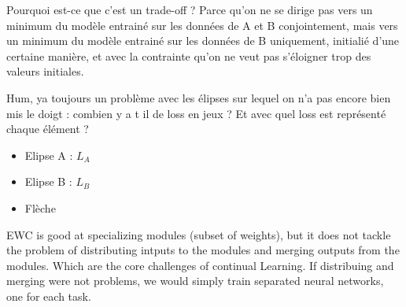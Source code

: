 \documentclass[twocolumn]{article}
\begin{document}
\vspace{1mm}
\noindent
Pourquoi est-ce que c'est un trade-off ? Parce qu'on ne se dirige pas vers un minimum du modèle entrainé sur les données de A et B conjointement, mais vers un minimum du modèle entrainé sur les données de B uniquement, initialié d'une certaine manière, et avec la contrainte qu'on ne veut pas s'éloigner trop des valeurs initiales.

\vspace{1mm}
\noindent
Hum, ya toujours un problème avec les élipses sur lequel on n'a pas encore bien mis le doigt : combien y a t il de loss en jeux ? Et avec quel loss est représenté chaque élément ?
\begin{itemize}
    \item Elipse A : $L_A$
    \item Elipse B : $L_B$
    \item Flèche
\end{itemize}

\vspace{1mm}
\noindent
EWC is good at specializing modules (subset of weights), but it does not tackle the problem of distributing intputs to the modules and merging outputs from the modules. Which are the core challenges of continual Learning. If distribuing and merging were not problems, we would simply train separated neural networks, one for each task.
\end{document}
